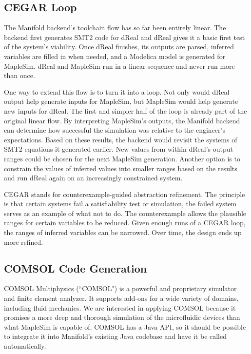 \subsection{CEGAR Loop}

The Manifold backend's toolchain flow has so far been entirely linear.
The backend first generates SMT2 code for dReal and dReal gives it a basic first test of the system's viability.
Once dReal finishes, its outputs are parsed, inferred variables are filled in when needed, and a Modelica model is generated for MapleSim.
dReal and MapleSim run in a linear sequence and never run more than once.

One way to extend this flow is to turn it into a loop.
Not only would dReal output help generate inputs for MapleSim, but MapleSim would help generate new inputs for dReal.
The first and simpler half of the loop is already part of the original linear flow.
By interpreting MapleSim's outputs, the Manifold backend can determine how successful the simulation was relative to the engineer's expectations.
Based on these results, the backend would revisit the systems of SMT2 equations it generated earlier.
New values from within dReal's output ranges could be chosen for the next MapleSim generation.
Another option is to constrain the values of inferred values into smaller ranges based on the results and run dReal again on an increasingly constrained system.

CEGAR stands for counterexample-guided abstraction refinement.
The principle is that certain systems fail a satisfiability test or simulation, the failed system serves as an example of what not to do.
The counterexample allows the plausible ranges for certain variables to be reduced.
Given enough runs of a CEGAR loop, the ranges of inferred variables can be narrowed.
Over time, the design ends up more refined.


\subsection{COMSOL Code Generation}

COMSOL Multiphysics (``COMSOL") is a powerful and proprietary simulator and finite element analyzer.
It supports add-ons for a wide variety of domains, including fluid mechanics.
We are interested in applying COMSOL because it promises a more deep and thorough simulation of the microfluidic devices than what MapleSim is capable of.
COMSOL has a Java API, so it should be possible to integrate it into Manifold's existing Java codebase and have it be called automatically.

